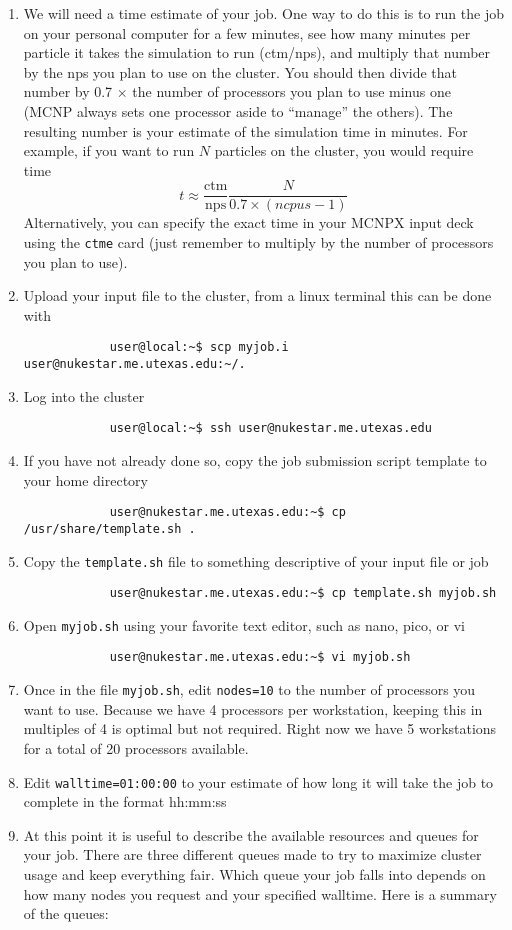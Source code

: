 \documentclass[a4paper, 12pt]{article}
\begin{document}
\begin{enumerate}
	\item We will need a time estimate of your job. One way to do this is to run the job on your personal computer for a few minutes, see how many minutes per particle it takes the simulation to run (ctm/nps), and multiply that number by the nps you plan to use on the cluster. You should then divide that number by 0.7 \(\times\) the number of processors you plan to use minus one (MCNP always sets one processor aside to ``manage'' the others). The resulting number is your estimate of the simulation time in minutes. For example, if you want to run \(N\) particles on the cluster, you would require time
	\[ t \approx \frac{\text{ctm}}{\text{nps}}\frac{N}{0.7 \times (ncpus-1)} \]
	Alternatively, you can specify the exact time in your MCNPX input deck using the \verb+ctme+ card (just remember to multiply by the number of processors you plan to use).
	\item Upload your input file to the cluster, from a linux terminal this can be done with
		\begin{verbatim}
			user@local:~$ scp myjob.i user@nukestar.me.utexas.edu:~/.
		\end{verbatim}
	\item Log into the cluster
		\begin{verbatim}
			user@local:~$ ssh user@nukestar.me.utexas.edu
		\end{verbatim}
	\item If you have not already done so, copy the job submission script template to your home directory
		\begin{verbatim}
			user@nukestar.me.utexas.edu:~$ cp /usr/share/template.sh . 
		\end{verbatim}
	\item Copy the \verb+template.sh+ file to something descriptive of your input file or job
		\begin{verbatim}
			user@nukestar.me.utexas.edu:~$ cp template.sh myjob.sh
		\end{verbatim}
	\item Open \verb+myjob.sh+ using your favorite text editor, such as nano, pico, or vi
		\begin{verbatim}
			user@nukestar.me.utexas.edu:~$ vi myjob.sh
		\end{verbatim}
	\item Once in the file \verb+myjob.sh+, edit \verb+nodes=10+ to the number of processors you want to use. Because we have 4 processors per workstation, keeping this in multiples of 4 is optimal but not required. Right now we have 5 workstations for a total of 20 processors available.
	\item Edit \verb+walltime=01:00:00+ to your estimate of how long it will take the job to complete in the format hh:mm:ss
	\item At this point it is useful to describe the available resources and queues for your job. There are three different queues made to try to maximize cluster usage and keep everything fair. Which queue your job falls into depends on how many nodes you request and your specified walltime. Here is a summary of the queues:


\end{enumerate}
\end{document}
